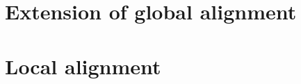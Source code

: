 \documentclass[12pt]{article}
\begin{document}
\section{Extension of global alignment}







\newpage

%
%
\setcounter{figure}{0}
\setcounter{table}{0}
\section{Local alignment}



\end{document}

